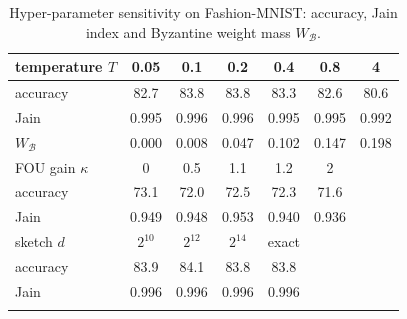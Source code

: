 \begin{table}[!tbp]
\centering
\caption{Hyper-parameter sensitivity on Fashion-MNIST: accuracy, Jain index and Byzantine weight mass $W_{\mathcal{B}}$.}
\label{tab:sens}
\setlength{\tabcolsep}{3.2pt}
\footnotesize
\begin{tabular}{lcccccc}
\toprule
temperature $T$ & 0.05 & 0.1 & 0.2 & 0.4 & 0.8 & 4\\
\midrule
accuracy & 82.7 & 83.8 & 83.8 & 83.3 & 82.6 & 80.6\\
Jain & 0.995 & 0.996 & 0.996 & 0.995 & 0.995 & 0.992\\
$W_{\mathcal{B}}$ & 0.000 & 0.008 & 0.047 & 0.102 & 0.147 & 0.198\\
\midrule
FOU gain $\kappa$ & 0 & 0.5 & 1.1 & 1.2 & 2 &\\
\midrule
accuracy & 73.1 & 72.0 & 72.5 & 72.3 & 71.6 &\\
Jain & 0.949 & 0.948 & 0.953 & 0.940 & 0.936 &\\
\midrule
sketch $d$ & $2^{10}$ & $2^{12}$ & $2^{14}$ & exact & &\\
\midrule
accuracy & 83.9 & 84.1 & 83.8 & 83.8 & &\\
Jain & 0.996 & 0.996 & 0.996 & 0.996 & &\\
\botrule
\end{tabular}
\end{table}
